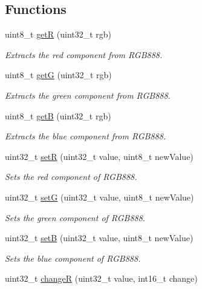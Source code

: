 \subsection*{Functions}
\begin{DoxyCompactItemize}
\item 
uint8\+\_\+t \hyperlink{namespaceColour_abad9ffef17d0d47b94a80a834e3b061e}{getR} (uint32\+\_\+t rgb)
\begin{DoxyCompactList}\small\item\em Extracts the red component from R\+G\+B888. \end{DoxyCompactList}\item 
uint8\+\_\+t \hyperlink{namespaceColour_afe62e2366d29eab29349e53694cf04c2}{getG} (uint32\+\_\+t rgb)
\begin{DoxyCompactList}\small\item\em Extracts the green component from R\+G\+B888. \end{DoxyCompactList}\item 
uint8\+\_\+t \hyperlink{namespaceColour_a217843f90fd11c5632683125e19bef08}{getB} (uint32\+\_\+t rgb)
\begin{DoxyCompactList}\small\item\em Extracts the blue component from R\+G\+B888. \end{DoxyCompactList}\item 
uint32\+\_\+t \hyperlink{namespaceColour_aafcc8ab12acc526fa93bee12b961edab}{setR} (uint32\+\_\+t value, uint8\+\_\+t new\+Value)
\begin{DoxyCompactList}\small\item\em Sets the red component of R\+G\+B888. \end{DoxyCompactList}\item 
uint32\+\_\+t \hyperlink{namespaceColour_a059504956471e6a07df579f59cec6e22}{setG} (uint32\+\_\+t value, uint8\+\_\+t new\+Value)
\begin{DoxyCompactList}\small\item\em Sets the green component of R\+G\+B888. \end{DoxyCompactList}\item 
uint32\+\_\+t \hyperlink{namespaceColour_a0b181bcc3bc52f87504d8f1cf3d0289a}{setB} (uint32\+\_\+t value, uint8\+\_\+t new\+Value)
\begin{DoxyCompactList}\small\item\em Sets the blue component of R\+G\+B888. \end{DoxyCompactList}\item 
uint32\+\_\+t \hyperlink{namespaceColour_ad2740cc3e6b9f1d65d6cfe085ec2f1bf}{changeR} (uint32\+\_\+t value, int16\+\_\+t change)

\end{DoxyCompactItemize}
